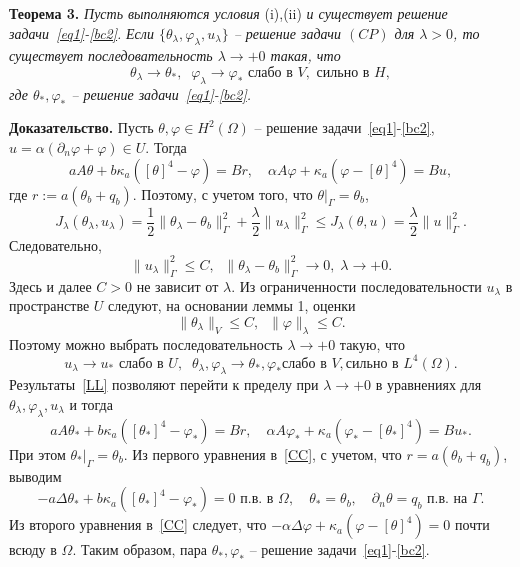 \textbf{Теорема 3.}
\textit{Пусть выполняются условия} (i),(ii) \textit{и существует решение задачи~\eqref{eq1}-\eqref{bc2}.}
        \textit{ Если $\{\theta_\lambda,\varphi_\lambda,u_\lambda\}$ -- решение
задачи $(CP)$ для $\lambda>0$, то существует последовательность
$\lambda\to +0$
такая, что}
\[
    \theta_\lambda\rightarrow\theta_*, \;\; \varphi_\lambda\rightarrow\varphi_*
    \text{ слабо в }V,\text{ сильно в }H,
\]
        \textit{где $\theta_*,\varphi_*$ -- решение задачи~\eqref{eq1}-\eqref{bc2}.}

        \textbf{Доказательство.}
Пусть $\theta,\varphi\in H^2(\Omega)$ -- решение задачи~\eqref{eq1}-\eqref{bc2},
$u=\alpha(\partial_n\varphi+\varphi)\in U.$ Тогда
\[
    a A \theta + b \kappa_a ([\theta]^4 - \varphi ) = Br,\quad
    \alpha A \varphi + \kappa_a (\varphi - [\theta]^4)  = Bu,
\]
где $r:=a(\theta_b+q_b).$ Поэтому, с учетом того, что $\theta|_\Gamma=\theta_b$,
\[
    J_\lambda(\theta_\lambda, u_\lambda) = \frac{1}{2}\|\theta_\lambda -\theta_b\|^2_\Gamma
    + \frac{\lambda}{2}\|u_\lambda\|^2_\Gamma\leq J_\lambda(\theta, u)=\frac{\lambda}{2}\|u\|^2_\Gamma.
\]
Следовательно,
\[
    \|u_\lambda\|^2_\Gamma\leq C,\;\; \|\theta_\lambda -\theta_b\|^2_\Gamma\to 0,\; \lambda\to +0.
\]
Здесь и далее $C>0$ не зависит от $\lambda.$
Из ограниченности последовательности $u_\lambda$ в пространстве $U$ следуют, на основании
леммы 1, оценки
\[
    \|\theta_\lambda\|_V \leq C,\;\;
    \|\varphi\|_\lambda \leq C.
\]
Поэтому можно выбрать последовательность $\lambda\to+0$ такую, что
\begin{equation}
    \label{LL}
    u_\lambda \rightarrow u_* \text{  слабо в } U, \;\;
    \theta_\lambda, \varphi_\lambda \rightarrow \theta_*,\varphi_* \text{
        слабо в } V, \text{
        сильно в } L^4(\Omega).
\end{equation}
Результаты~\eqref{LL} позволяют перейти к пределу при $\lambda\to+0$
в уравнениях для $\theta_\lambda,\varphi_\lambda,u_\lambda$ и тогда
\begin{equation}
    \label{CC}
    a A \theta_* + b \kappa_a ([\theta_*]^4 - \varphi_* ) = Br,\quad
    \alpha A \varphi_* + \kappa_a (\varphi_* - [\theta_*]^4)  = Bu_*.
\end{equation}
При этом $\theta_*|_\Gamma=\theta_b.$
Из первого уравнения в~\eqref{CC}, с учетом, что $r=a(\theta_b+q_b)$,
выводим
\[
    - a\Delta\theta_* + b\kappa_a([\theta_*]^4- \varphi_*)=0 \text{ п.в. в }\Omega,
    \quad \theta_*=\theta_b,\quad \partial_n\theta = q_b \text{ п.в. на  }\Gamma.
\]
Из второго уравнения в~\eqref{CC} следует, что $-\alpha \Delta \varphi +
\kappa_a(\varphi-[\theta]^4)=0$ почти всюду в $\Omega.$ Таким образом,
пара $\theta_*,\varphi_*$ -- решение задачи~\eqref{eq1}-\eqref{bc2}.

